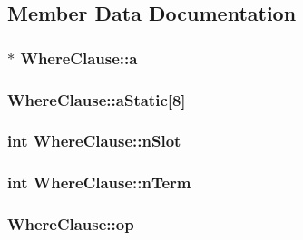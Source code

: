 \subsection{Member Data Documentation}
\hypertarget{struct_where_clause_a140d726a3e20ac7b6853d539c59add72}{
\subsubsection[{a}]{$\ast$ Where\-Clause\-::a}}\label{struct_where_clause_a140d726a3e20ac7b6853d539c59add72}
\hypertarget{struct_where_clause_a4acb8640bc9f42752900de5735bcd8e0}{
\subsubsection[{a\-Static}]{ Where\-Clause\-::a\-Static\mbox{[}8\mbox{]}}}\label{struct_where_clause_a4acb8640bc9f42752900de5735bcd8e0}
\hypertarget{struct_where_clause_ac92b93d65d4c3d9216707a049a4edb1c}{
\subsubsection[{n\-Slot}]{\setlength{\rightskip}{0pt plus 5cm}int Where\-Clause\-::n\-Slot}}\label{struct_where_clause_ac92b93d65d4c3d9216707a049a4edb1c}
\hypertarget{struct_where_clause_ab84924c3c78af1ab387ab3919c5031c4}{
\subsubsection[{n\-Term}]{\setlength{\rightskip}{0pt plus 5cm}int Where\-Clause\-::n\-Term}}\label{struct_where_clause_ab84924c3c78af1ab387ab3919c5031c4}
\hypertarget{struct_where_clause_a7a56a5fe1ab6603e930f3b5372ff2f71}{
\subsubsection[{op}]{ Where\-Clause\-::op}}\label{struct_where_clause_a7a56a5fe1ab6603e930f3b5372ff2f71}
